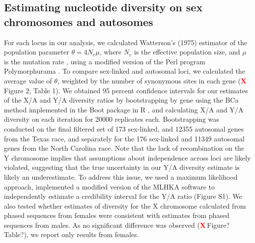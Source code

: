 \documentclass[9pt,twocolumn,twoside]{gsajnl}
\newcommand{\X}{\textcolor{red}{\bf X\,}}
\begin{document}
\subsection*{Estimating nucleotide diversity on sex chromosomes and autosomes}
For each locus in our analysis, we calculated Watterson’s (1975) estimator of the population parameter $\theta=4N_{e}\mu$, where $N_{e}$ is the effective population size, and $\mu$ is the mutation rate \citep{watterson1975}, using a modified version of the Perl program Polymorphurama \citep{bachtrog2006}. To compare sex-linked and autosomal loci, we calculated the average value of $\theta$, weighted by the number of synonymous sites in each gene (\X Figure 2; Table 1). We obtained 95 percent confidence intervals for our estimates of the X/A and Y/A diversity ratios by bootstrapping by gene using the BCa method \citep{efron1994} implemented in the Boot package in R \citep{canty2012boot}, and calculating X/A and Y/A diversity on each iteration for 20000 replicates each. Bootstrapping was conducted on the final filtered set of 173 sex-linked, and 12355 autosomal genes from the Texas race, and separately for the 176 sex-linked and 11349 autosomal genes from the North Carolina race. Note that the lack of recombination on the Y chromosome implies that assumptions about independence across loci are likely violated, suggesting that the true uncertainty in our Y/A diversity estimate is likely an underestimate. To address this issue, we used a maximum likelihood approach, implemented a modified version of the MLHKA software \citep{wright2004hka} to independently estimate a credibility interval for the Y/A ratio (Figure S1). We also tested whether estimates of diversity for the X chromosome calculated from phased sequences from females were consistent with estimates from phased sequences from males. As no significant difference was observed (\X Figure? Table?), we report only results from females.
\end{document}
